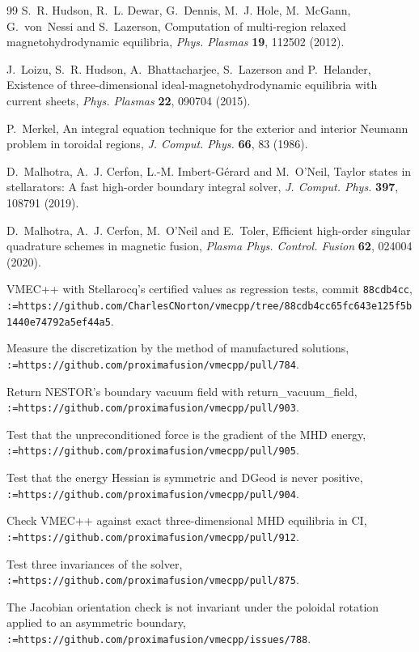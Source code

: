 \documentclass[11pt]{article}
\makeatletter
\newcommand{\code}[1]{\texttt{#1}}
\def\sq@slash{/}
\newcommand{\link}[1]{\texttt{\@tfor\sq@t:=#1\do{\sq@t\ifx\sq@t\sq@slash\allowbreak\fi}}}
\makeatother
\begin{document}
\begin{thebibliography}{99}
S.~R. Hudson, R.~L. Dewar, G.~Dennis, M.~J. Hole, M.~McGann, G.~von~Nessi and
S.~Lazerson, Computation of multi-region relaxed magnetohydrodynamic equilibria,
\emph{Phys. Plasmas} \textbf{19}, 112502 (2012).

J.~Loizu, S.~R. Hudson, A.~Bhattacharjee, S.~Lazerson and P.~Helander,
Existence of three-dimensional ideal-magnetohydrodynamic equilibria with current
sheets, \emph{Phys. Plasmas} \textbf{22}, 090704 (2015).

P.~Merkel, An integral equation technique for the exterior and interior Neumann
problem in toroidal regions, \emph{J. Comput. Phys.} \textbf{66}, 83 (1986).

D.~Malhotra, A.~J. Cerfon, L.-M. Imbert-G\'erard and M.~O'Neil, Taylor states in
stellarators: A fast high-order boundary integral solver, \emph{J. Comput.
Phys.} \textbf{397}, 108791 (2019).

D.~Malhotra, A.~J. Cerfon, M.~O'Neil and E.~Toler, Efficient high-order
singular quadrature schemes in magnetic fusion, \emph{Plasma Phys. Control.
Fusion} \textbf{62}, 024004 (2020).

VMEC++ with Stellarocq's certified values as regression tests, commit
\code{88cdb4cc},
\link{https://github.com/CharlesCNorton/vmecpp/tree/88cdb4cc65fc643e125f5b1440e74792a5ef44a5}.

Measure the discretization by the method of manufactured solutions,
\link{https://github.com/proximafusion/vmecpp/pull/784}.

Return NESTOR's boundary vacuum field with return\_vacuum\_field,
\link{https://github.com/proximafusion/vmecpp/pull/903}.

Test that the unpreconditioned force is the gradient of the MHD energy,
\link{https://github.com/proximafusion/vmecpp/pull/905}.

Test that the energy Hessian is symmetric and DGeod is never positive,
\link{https://github.com/proximafusion/vmecpp/pull/904}.

Check VMEC++ against exact three-dimensional MHD equilibria in CI,
\link{https://github.com/proximafusion/vmecpp/pull/912}.

Test three invariances of the solver,
\link{https://github.com/proximafusion/vmecpp/pull/875}.

The Jacobian orientation check is not invariant under the poloidal rotation
applied to an asymmetric boundary, \link{https://github.com/proximafusion/vmecpp/issues/788}.


\end{thebibliography}
\end{document}
